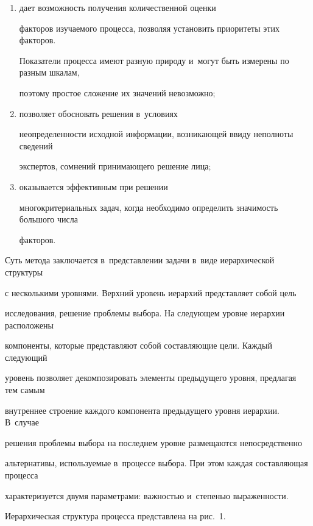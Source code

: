       \begin{enumerate}[(1)]

      \item дает возможность получения количественной оценки 

факторов изучаемого процесса, позволяя установить приоритеты этих факторов. 

Показатели процесса имеют разную природу и~могут быть измерены по разным шкалам, 

поэтому простое сложение их значений невозможно; 

      \item позволяет обосновать решения в~условиях 

неопределенности исходной информации, возникающей ввиду неполноты сведений 

экспертов, сомнений принимающего решение лица;

      \item оказывается эффективным при решении 

многокритериальных задач, когда необходимо определить значимость большого числа 

факторов.

      \end{enumerate}

      

      Суть метода заключается в~представлении задачи в~виде иерархической структуры 

с несколькими уровнями. Верхний уровень иерархий представляет собой цель 

исследования, решение проблемы выбора. На следующем уровне иерархии расположены 

компоненты, которые представляют собой составляющие цели. Каждый следующий 

уровень позволяет декомпозировать элементы предыду\-ще\-го уровня, предлагая тем самым 

внутреннее строение каждого компонента предыду\-ще\-го уровня иерархии. В~случае 

решения проблемы выбора на последнем уровне размещаются непосредственно 

альтернативы, используемые в~процессе выбора. При этом каждая составляющая процесса 

характеризуется двумя параметрами: важностью и~степенью выраженности. 

Иерархическая структура процесса представлена на рис.~1.

     


